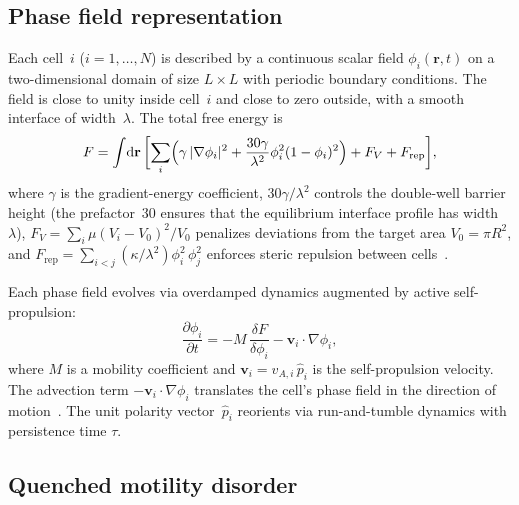 \documentclass[aps,pre,twocolumn,superscriptaddress,longbibliography,floatfix]{revtex4-2}
\newcommand{\dd}{\mathrm{d}}
\begin{document}
\subsection{Phase field representation}

Each cell~$i$ ($i=1,\ldots,N$) is described by a continuous scalar
field $\phi_i(\mathbf{r},t)$ on a two-dimensional domain of size
$L\!\times\!L$ with periodic boundary conditions.  The field is close
to unity inside cell~$i$ and close to zero outside, with a smooth
interface of width~$\lambda$.  The total free energy is
\begin{equation}
  F = \int\!\dd\mathbf{r}\,\biggl[
    \sum_i \Bigl(\gamma\,|\nabla\phi_i|^2 + \frac{30\gamma}{\lambda^2}
    \phi_i^2(1-\phi_i)^2\Bigr)
    + F_V + F_{\mathrm{rep}}
  \biggr],
\label{eq:free-energy}
\end{equation}
where $\gamma$ is the gradient-energy coefficient, $30\gamma/\lambda^2$
controls the double-well barrier height (the prefactor~30 ensures that
the equilibrium interface profile has width~$\lambda$),
$F_V = \sum_i \mu(V_i - V_0)^2/V_0$ penalizes deviations from the
target area $V_0 = \pi R^2$, and
$F_{\mathrm{rep}} = \sum_{i<j}(\kappa/\lambda^2)
\phi_i^2\,\phi_j^2$ enforces steric repulsion between
cells~\cite{nonomura2012,palmieri2015}.

Each phase field evolves via overdamped dynamics augmented by active
self-propulsion:
\begin{equation}
  \frac{\partial\phi_i}{\partial t}
  = -M\,\frac{\delta F}{\delta\phi_i}
  - \mathbf{v}_i\cdot\nabla\phi_i,
\label{eq:dynamics}
\end{equation}
where $M$ is a mobility coefficient and
$\mathbf{v}_i = v_{A,i}\,\hat{p}_i$ is the self-propulsion velocity.
The advection term $-\mathbf{v}_i\cdot\nabla\phi_i$ translates the
cell's phase field in the direction of motion~\cite{palmieri2015}.
The unit polarity vector~$\hat{p}_i$ reorients via run-and-tumble
dynamics with persistence time $\tau$.

\subsection{Quenched motility disorder}
\end{document}
